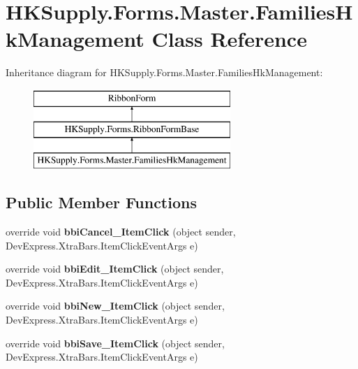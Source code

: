 \hypertarget{class_h_k_supply_1_1_forms_1_1_master_1_1_families_hk_management}{}\section{H\+K\+Supply.\+Forms.\+Master.\+Families\+Hk\+Management Class Reference}
\label{class_h_k_supply_1_1_forms_1_1_master_1_1_families_hk_management}
Inheritance diagram for H\+K\+Supply.\+Forms.\+Master.\+Families\+Hk\+Management\+:\begin{figure}[H]
\begin{center}
\leavevmode
\includegraphics[height=3.000000cm]{class_h_k_supply_1_1_forms_1_1_master_1_1_families_hk_management}
\end{center}
\end{figure}
\subsection*{Public Member Functions}
\begin{DoxyCompactItemize}
\item 
\mbox{\label{class_h_k_supply_1_1_forms_1_1_master_1_1_families_hk_management_ab803ee4fac0b7001571e61569262268a}} 
override void {\bfseries bbi\+Cancel\+\_\+\+Item\+Click} (object sender, Dev\+Express.\+Xtra\+Bars.\+Item\+Click\+Event\+Args e)
\item 
\mbox{\label{class_h_k_supply_1_1_forms_1_1_master_1_1_families_hk_management_af973e946e5d9368f3130014afb32d422}} 
override void {\bfseries bbi\+Edit\+\_\+\+Item\+Click} (object sender, Dev\+Express.\+Xtra\+Bars.\+Item\+Click\+Event\+Args e)
\item 
\mbox{\label{class_h_k_supply_1_1_forms_1_1_master_1_1_families_hk_management_aefb7f0201242fec09963d8c2dab47fed}} 
override void {\bfseries bbi\+New\+\_\+\+Item\+Click} (object sender, Dev\+Express.\+Xtra\+Bars.\+Item\+Click\+Event\+Args e)
\item 
\mbox{\label{class_h_k_supply_1_1_forms_1_1_master_1_1_families_hk_management_ab14cac18d6901c43be3fd28ee3265a1d}} 
override void {\bfseries bbi\+Save\+\_\+\+Item\+Click} (object sender, Dev\+Express.\+Xtra\+Bars.\+Item\+Click\+Event\+Args e)
\end{DoxyCompactItemize}
